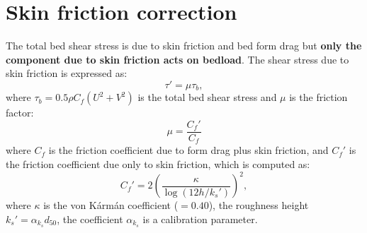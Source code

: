 \section{Skin friction correction}\label{sec:skin}
The total bed shear stress is due to skin friction and bed form drag but \textbf{only the component due to skin friction acts on bedload}. The shear stress due to skin friction is expressed as:
\begin{equation}\label{eq:taup}
\tau'=\mu\tau_b,
\end{equation}
where $\tau_b = 0.5 \rho C_f (U^2 + V^2)$ is the total bed shear stress and $\mu$ is the friction factor:
\begin{equation}\label{eq:mu}
\mu=\frac{C_f'}{C_f}
\end{equation}
where $C_f$ is the friction coefficient due to form drag plus skin friction, and $C_f'$ is the friction coefficient due only to skin friction, which is computed as:
\begin{equation}\label{eq:cfp}
C_f'=2\left(\frac{\kappa}{\log(12h/k_s')}\right)^2,
\end{equation}
where $\kappa$ is the von K\'arm\'an coefficient ($=0.40$), the roughness height $k_s'=\alpha_{k_s}d_{50}$, the coefficient $\alpha_{k_s}$ is a calibration parameter.

